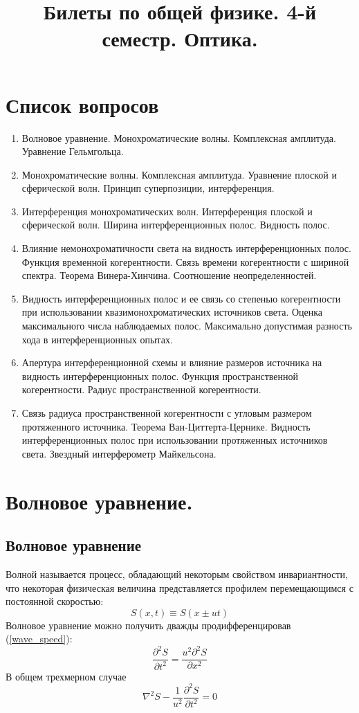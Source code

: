 \documentclass[a4paper, 12pt]{book}
\title{Билеты по общей физике. 4-й семестр. Оптика.}
\begin{document}
	\maketitle
	\newpage
	\tableofcontents
	\chapter{Список вопросов}
	\begin{enumerate}
		\item Волновое уравнение. Монохроматические волны. Комплексная амплитуда. Уравнение Гельмгольца.
		\item Монохроматические волны. Комплексная амплитуда. Уравнение плоской и сферической волн. Принцип суперпозиции, интерференция.
		\item Интерференция монохроматических волн. Интерференция плоской и сферической волн. Ширина интерференционных полос. Видность полос.
		\item Влияние немонохроматичности света на видность интерференционных полос. Функция временной когерентности. Связь времени когерентности с шириной спектра. Теорема Винера-Хинчина. Соотношение неопределенностей.
		\item Видность интерференционных полос и ее связь со степенью когерентности при использовании квазимонохроматических источников света. Оценка максимального числа наблюдаемых полос. Максимально допустимая разность хода в интерференционных опытах.
		\item Апертура интерференционной схемы и влияние размеров источника на видность интерференционных полос. Функция пространственной когерентности. Радиус пространственной когерентности.
		\item Связь радиуса пространственной когерентности с угловым размером протяженного источника. Теорема Ван-Циттерта-Цернике. Видность интерференционных полос при использовании протяженных источников света. Звездный интерферометр Майкельсона.
	\end{enumerate}
	\chapter{Волновое уравнение.}
	\section{Волновое уравнение}
	Волной называется процесс, обладающий некоторым свойством инвариантности, что некоторая физическая величина представляется профилем перемещающимся с постоянной скоростью:
	\begin{equation}
		S\left(x,t\right)\equiv S\left(x\pm ut\right)
		\label{wave_speed}
	\end{equation}
	Волновое уравнение можно получить дважды продифференцировав (\ref{wave_speed}):
	\begin{equation}
		\frac{\partial^2 S}{\partial t^2}=\frac{u^2\partial^2 S}{\partial x^2}
	\end{equation}
	В общем трехмерном случае
	\begin{equation}
		\nabla^2 S-\frac{1}{u^2}\frac{\partial^2 S}{\partial t^2}=0
	\end{equation}
\end{document}
